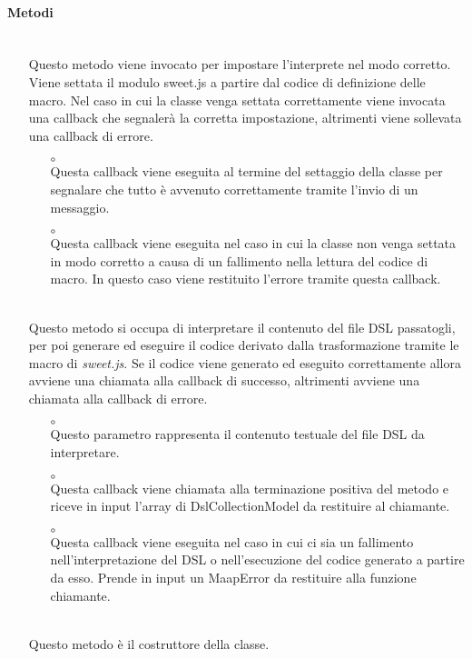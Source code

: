 \paragraph*{Metodi}
\begin{itemize}
\item[]  \\ Questo metodo viene invocato per impostare l'interprete nel modo corretto. Viene settata il modulo sweet.js a partire dal codice di definizione delle macro. Nel caso in cui la classe venga settata correttamente viene invocata una callback che segnalerà la corretta impostazione, altrimenti viene sollevata una callback di errore.
\begin{itemize}\addtolength{\itemsep}{-0.5\baselineskip}
\item[$\circ$]  \\ Questa callback viene eseguita al termine del settaggio della classe per segnalare che tutto è avvenuto correttamente tramite l'invio di un messaggio.
\item[$\circ$]  \\ Questa callback viene eseguita nel caso in cui la classe non venga settata in modo corretto a causa di un fallimento nella lettura del codice di macro. In questo caso viene restituito l'errore tramite questa callback.
\end{itemize}
\item[]  \\ Questo metodo si occupa di interpretare il contenuto del file DSL passatogli, per poi generare ed eseguire il codice derivato dalla trasformazione tramite le macro di \textit{sweet.js}. Se il codice viene generato ed eseguito correttamente allora avviene una chiamata alla callback di successo, altrimenti avviene una chiamata alla callback di errore.
\begin{itemize}\addtolength{\itemsep}{-0.5\baselineskip}
\item[$\circ$]  \\ Questo parametro rappresenta il contenuto testuale del file DSL da interpretare.
\item[$\circ$]  \\ Questa callback viene chiamata alla terminazione positiva del metodo e riceve in input l'array di DslCollectionModel da restituire al chiamante.
\item[$\circ$]  \\ Questa callback viene eseguita nel caso in cui ci sia un fallimento nell'interpretazione del DSL o nell'esecuzione del codice generato a partire da esso. Prende in input un MaapError da restituire alla funzione chiamante.
\end{itemize}
\item[]  \\ Questo metodo è il costruttore della classe.
\end{itemize}

